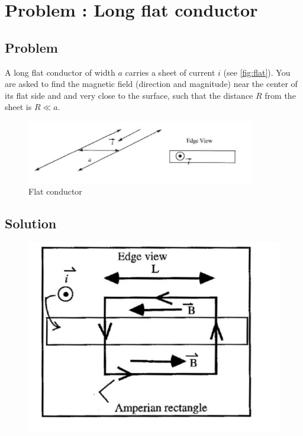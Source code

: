 \documentclass[solutions]{esg8022pset}
\date{\today }
\begin{document}
\section{Problem \thesection: Long flat conductor}
\subsection{Problem}
  A long flat conductor of width $a$ carries a sheet of current $i$ (see
  \autoref{fig:flat}). You are asked to find the magnetic field (direction and
  magnitude) near the center of its flat side and and very close to the
  surface, such that the distance $R$ from the sheet is $R \ll a$.

  \begin{figure}[ht]
    \centering
    \includegraphics[width = 10cm]{flat_conductor}
    \caption{Flat conductor}
    \label{fig:flat}
  \end{figure}

\subsection{Solution}

  \begin{figure}[ht]
    \centering
    \includegraphics[width = 12cm]{flat_conductor_sol}
    \label{fig:flatsol}
  \end{figure}
\end{document}
